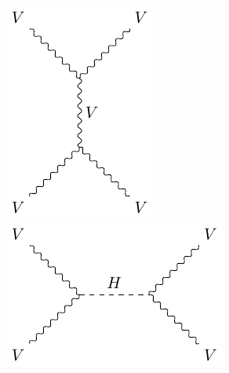 \begin{figure}[!ht]
\begin{minipage}{0.18\textwidth}
    \includegraphics[width=\textwidth]{figures/feyn_vbs_4.pdf}
  \end{minipage}%
  \begin{minipage}{0.23\textwidth}
    \includegraphics[width=\textwidth]{figures/feyn_vbs_3.pdf}

\end{minipage}
\end{figure}
